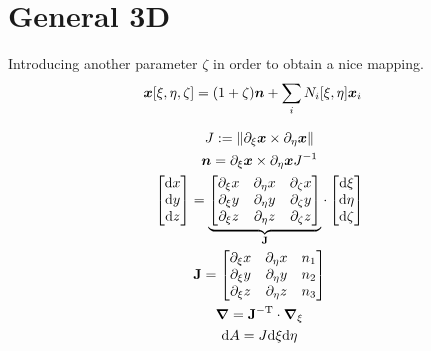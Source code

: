 \documentclass[a4paper,11pt]{article}
\renewcommand{\to}[1]{\text{\boldmath $#1$}} %
\newcommand{\ts}[1]{\text{\boldmath $\mathrm{#1}$}} %
\newcommand{\uv}[1]{\mathds{#1}}
\newcommand{\um}[1]{\mathds{#1}}
\newcommand{\intd}[1]{\mathrm{d}#1}
\newcommand{\pderiv}[2]{\partial_{#2} #1}
\newcommand{\norm}[1]{\left\lVert{#1}\right\rVert}
\newcommand{\T}{\mathrm{T}}
\newcommand{\defeq}{:=}
\begin{document}
\section{General 3D}

Introducing another parameter $\zeta$ in order to obtain a nice mapping.
\begin{align}
 \to x[\xi,\eta,\zeta] &= (1+\zeta)\to n + \sum_i N_i[\xi,\eta]\to x_i  %
\end{align}

\begin{gather}
 J \defeq \norm{\pderiv{\to x}{\xi} \times  \pderiv{\to x}{\eta}}\\
 \to n = \pderiv{\to x}{\xi} \times \pderiv{\to x}{\eta} J^{-1}\\
 \begin{bmatrix}\intd x\\ \intd y\\ \intd z\end{bmatrix} =
  \underbrace{\begin{bmatrix}\pderiv{x}{\xi} & \pderiv{x}{\eta} & \pderiv{x}{\zeta}\\
	  \pderiv{y}{\xi} & \pderiv{y}{\eta} & \pderiv{y}{\zeta}\\
	  \pderiv{z}{\xi} & \pderiv{z}{\eta} & \pderiv{z}{\zeta} \end{bmatrix}}_{\ts J}
  \cdot \begin{bmatrix}\intd \xi \\ \intd \eta \\ \intd \zeta\end{bmatrix}\\
  \ts J = \begin{bmatrix}\pderiv{x}{\xi} & \pderiv{x}{\eta} & n_1\\
	  \pderiv{y}{\xi} & \pderiv{y}{\eta} & n_2\\
	  \pderiv{z}{\xi} & \pderiv{z}{\eta} & n_3 \end{bmatrix}\\
 \to\nabla = \ts J^{-\T}\cdot\to\nabla_\xi\\
 \intd A = J \intd \xi \intd \eta 
\end{gather}
\end{document}
